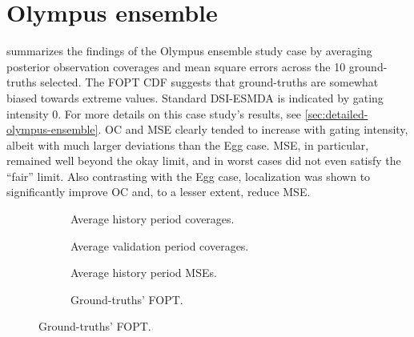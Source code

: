 \section{Olympus ensemble}
\label{sec:results-olympus}

 summarizes the findings of the Olympus ensemble study case 
by averaging posterior observation coverages and mean square errors across the 10 ground-truths selected.
The FOPT CDF suggests that ground-truths are somewhat biased towards extreme values.
Standard DSI-ESMDA is indicated by gating intensity 0.
For more details on this case study's results, see
\cref{sec:detailed-olympus-ensemble}.
%
OC and MSE clearly tended to increase with gating intensity,
albeit with much larger deviations than the Egg case. 
MSE, in particular, remained well beyond the okay limit, 
and in worst cases did not even satisfy the ``fair'' limit.
%
Also contrasting with the Egg case, localization was shown to significantly 
improve OC and, to a lesser extent, reduce MSE.

\begin{figure}[htbp]
    \caption{%
        Summary of results for the Olympus ensemble.
        Posterior coverage and MSE are averaged across ground-truths.
    }
    \label{fig:olympus-summaries}
    \begin{subfigure}{.495\linewidth}
        \centering
        \caption{Average history period coverages.}
        
    \end{subfigure}
    \begin{subfigure}{.495\linewidth}
        \centering
        \caption{Average validation period coverages.}
        
    \end{subfigure}
    \begin{subfigure}{.49\linewidth}
        \centering
        \caption{Average history period MSEs.}
        
    \end{subfigure}
    \begin{subfigure}{.49\linewidth}
        \centering
        \caption{
            Ground-truths' FOPT.
        }
        \label{fig:fopt-olympus} 
        
    \end{subfigure}
\end{figure}

